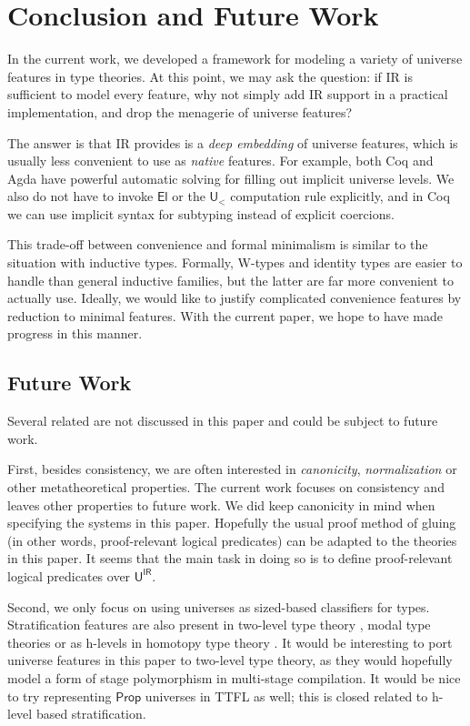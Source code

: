 \documentclass[a4paper,UKenglish,cleveref, autoref, thm-restate]{lipics-v2021}
\theoremstyle{remark}
\theoremstyle{definition}
\newcommand{\U}{\mathsf{U}}
\newcommand{\El}{\mathsf{El}}
\renewcommand{\U}{\mathsf{U}}
\newcommand{\msf}[1]{\mathsf{#1}}
\newcommand{\uir}{\msf{U^{IR}}}
\newcommand{\ult}{\U_{<}}
\begin{document}
\section{Conclusion and Future Work} \label{sec:conclusion}

In the current work, we developed a framework for modeling a variety of universe
features in type theories. At this point, we may ask the question: if IR is
sufficient to model every feature, why not simply add IR support in a practical
implementation, and drop the menagerie of universe features?

The answer is that IR provides is a \emph{deep embedding} of universe features,
which is usually less convenient to use as \emph{native} features. For example,
both Coq and Agda have powerful automatic solving for filling out implicit
universe levels. We also do not have to invoke $\El$ or the $\ult$ computation
rule explicitly, and in Coq we can use implicit syntax for subtyping instead of
explicit coercions.

This trade-off between convenience and formal minimalism is similar to the
situation with inductive types. Formally, W-types and identity types are easier
to handle than general inductive families, but the latter are far more
convenient to actually use. Ideally, we would like to justify complicated
convenience features by reduction to minimal features. With the current paper,
we hope to have made progress in this manner.

\subsection{Future Work}

Several related are not discussed in this paper and could be subject to future
work.

First, besides consistency, we are often interested in \emph{canonicity},
\emph{normalization} or other metatheoretical properties. The current work
focuses on consistency and leaves other properties to future work. We did keep
canonicity in mind when specifying the systems in this paper. Hopefully the
usual proof method of gluing (in other words, proof-relevant logical predicates)
\cite{kaposi2019gluing, sterling2019algebraic} can be adapted to the theories in
this paper. It seems that the main task in doing so is to define proof-relevant
logical predicates over $\uir$.

Second, we only focus on using universes as sized-based classifiers for
types. Stratification features are also present in two-level type theory
\cite{twolevel}, modal type theories \cite{gratzer20multimodal} or as h-levels
in homotopy type theory \cite{hottbook}. It would be interesting to port
universe features in this paper to two-level type theory, as they would
hopefully model a form of stage polymorphism in multi-stage compilation. It
would be nice to try representing $\msf{Prop}$ universes in TTFL as well;
this is closed related to h-level based stratification.
\end{document}
